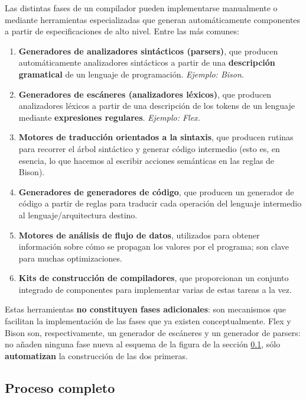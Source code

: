 \documentclass[11pt,a4paper]{article}
\begin{document}
Las distintas fases de un compilador pueden implementarse manualmente o mediante herramientas
especializadas que generan automáticamente componentes a partir de especificaciones de alto
nivel. Entre las más comunes:

\begin{enumerate}
    \item \textbf{Generadores de analizadores sintácticos (parsers)}, que producen
    automáticamente analizadores sintácticos a partir de una \textbf{descripción gramatical} de
    un lenguaje de programación. \textit{Ejemplo: Bison.}
    \item \textbf{Generadores de escáneres (analizadores léxicos)}, que producen analizadores
    léxicos a partir de una descripción de los tokens de un lenguaje mediante
    \textbf{expresiones regulares}. \textit{Ejemplo: Flex.}
    \item \textbf{Motores de traducción orientados a la sintaxis}, que producen rutinas para
    recorrer el árbol sintáctico y generar código intermedio (esto es, en esencia, lo que
    hacemos al escribir acciones semánticas en las reglas de Bison).
    \item \textbf{Generadores de generadores de código}, que producen un generador de código a
    partir de reglas para traducir cada operación del lenguaje intermedio al lenguaje/arquitectura
    destino.
    \item \textbf{Motores de análisis de flujo de datos}, utilizados para obtener información
    sobre cómo se propagan los valores por el programa; son clave para muchas optimizaciones.
    \item \textbf{Kits de construcción de compiladores}, que proporcionan un conjunto integrado
    de componentes para implementar varias de estas tareas a la vez.
\end{enumerate}

Estas herramientas \textbf{no constituyen fases adicionales}: son mecanismos que facilitan la
implementación de las fases que ya existen conceptualmente. Flex y Bison son, respectivamente,
un generador de escáneres y un generador de parsers: no añaden ninguna fase nueva al esquema de
la figura de la sección \ref{sec:proceso-completo}, sólo \textbf{automatizan} la construcción de
las dos primeras.

\subsection{Proceso completo}
\label{sec:proceso-completo}
\end{document}
